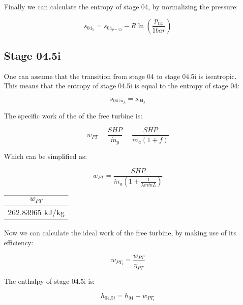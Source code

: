 \documentclass[titlepage]{article}
\begin{document}
    Finally we can calculate the entropy of stage 04, by normalizing the pressure:

    \begin{equation}
        s_{04_{\lambda}} = s_{04_{p=1 \lambda}} - R \ln \left( \frac{p_{04}}{1 bar} \right)
    \end{equation}

    \subsection{Stage 04.5i}

    One can assume that the transition from stage 04 to stage 04.5i is isentropic. This means that the entropy of stage 04.5i is equal to the entropy of stage 04:

    \begin{equation}
        s_{04.5i_{\lambda}} = s_{04_{\lambda}}
    \end{equation}

    The specific work of the of the free turbine is:

    \begin{equation}
        w_{PT} = \frac{SHP}{\dot{m}_{g}} = \frac{SHP}{\dot{m}_{a} (1 +f)}
    \end{equation}

    Which can be simplified as:

    \begin{equation}
        w_{PT} = \frac{SHP}{\dot{m}_{a} \left(1 + \frac{1}{\lambda minL}\right)}
    \end{equation}

    \begin{center}
        \begin{tabular}{|c|}
            \hline
            $w_{PT}$ \\
            \hline
            262.83965 kJ/kg \\
            \hline
        \end{tabular}
    \end{center}

    Now we can calculate the ideal work of the free turbine, by making use of its efficiency:

    \begin{equation}
        w_{PT_{i}} = \frac{w_{PT}}{\eta_{PT}}
    \end{equation}

    The enthalpy of stage 04.5i is:

    \begin{equation}
        h_{04.5i} = h_{04} - w_{PT_{i}}
    \end{equation}
\end{document}

